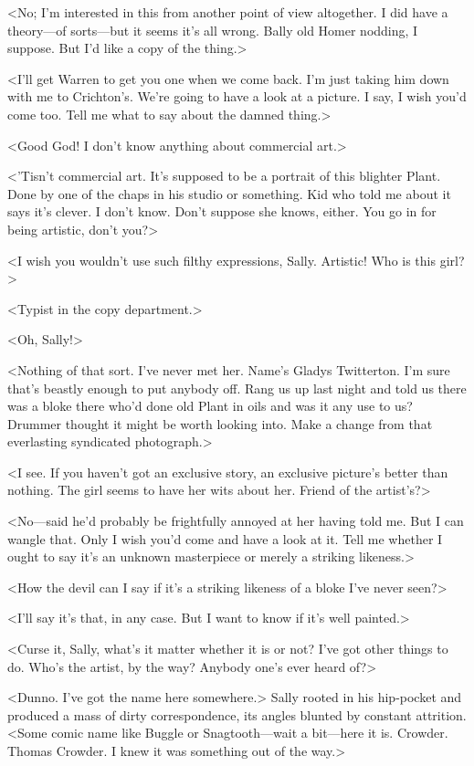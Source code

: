 <No; I'm interested in this from another point of view altogether. I did have a theory—of sorts—but it seems it's all wrong. Bally old Homer nodding, I suppose. But I'd like a copy of the thing.>

<I'll get Warren to get you one when we come back. I'm just taking him down with me to Crichton's. We're going to have a look at a picture. I say, I wish you'd come too. Tell me what to say about the damned thing.>

<Good God! I don't know anything about commercial art.>

<'Tisn't commercial art. It's supposed to be a portrait of this blighter Plant. Done by one of the chaps in his studio or something. Kid who told me about it says it's clever. I don't know. Don't suppose she knows, either. You go in for being artistic, don't you?>

<I wish you wouldn't use such filthy expressions, Sally. Artistic! Who is this girl?>

<Typist in the copy department.>

<Oh, Sally!>

<Nothing of that sort. I've never met her. Name's Gladys Twitterton. I'm sure that's beastly enough to put anybody off. Rang us up last night and told us there was a bloke there who'd done old Plant in oils and was it any use to us? Drummer thought it might be worth looking into. Make a change from that everlasting syndicated photograph.>

<I see. If you haven't got an exclusive story, an exclusive picture's better than nothing. The girl seems to have her wits about her. Friend of the artist's?>

<No—said he'd probably be frightfully annoyed at her having told me. But I can wangle that. Only I wish you'd come and have a look at it. Tell me whether I ought to say it's an unknown masterpiece or merely a striking likeness.>

<How the devil can I say if it's a striking likeness of a bloke I've never seen?>

<I'll say it's that, in any case. But I want to know if it's well painted.>

<Curse it, Sally, what's it matter whether it is or not? I've got other things to do. Who's the artist, by the way? Anybody one's ever heard of?>

<Dunno. I've got the name here somewhere.> Sally rooted in his hip-pocket and produced a mass of dirty correspondence, its angles blunted by constant attrition. <Some comic name like Buggle or Snagtooth—wait a bit—here it is. Crowder. Thomas Crowder. I knew it was something out of the way.>

